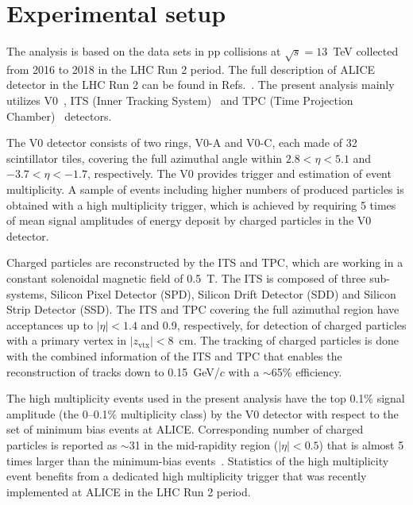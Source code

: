 

\section{Experimental setup}
\label{sec:experiment}

The analysis is based on the data sets in pp collisions at $\sqrt{s} = 13$~TeV collected from 2016 to 2018 in the LHC Run 2 period. The full description of ALICE detector in the LHC Run 2 can be found in Refs.~\cite{Aamodt:2008zz,Abelev:2014ffa}. The present analysis mainly utilizes V0~\cite{Abbas:2013taa}, ITS (Inner Tracking System)~\cite{aliceITS} and TPC (Time Projection Chamber)~\cite{aliceTPC} detectors.


The V0 detector consists of two rings, V0-A and V0-C, each made of 32 scintillator tiles, covering the full azimuthal angle within $2.8 < \eta < 5.1$ and $-3.7 < \eta < -1.7$, respectively. The V0 provides trigger and estimation of event multiplicity. A sample of events including higher numbers of produced particles is obtained with a high multiplicity trigger, which is achieved by requiring 5 times of mean signal amplitudes of energy deposit by charged particles in the V0 detector.

Charged particles are reconstructed by the ITS and TPC, which are working in a constant solenoidal magnetic field of 0.5~T. The ITS is composed of three sub-systems, Silicon Pixel Detector (SPD), Silicon Drift Detector (SDD) and Silicon Strip Detector (SSD). The ITS and TPC covering the full azimuthal region have acceptances up to $|\eta| < 1.4$ and 0.9, respectively, for detection of charged particles with a primary vertex in $|z_\mathrm{vtx}| < 8$~cm. The tracking of charged particles is done with the combined information of the ITS and TPC that enables the reconstruction of tracks down to 0.15~GeV/$c$ with a $\sim $65\% efficiency.

The high multiplicity events used in the present analysis have the top 0.1\% signal amplitude (the 0--0.1\% multiplicity class) by the V0 detector with respect to the set of minimum bias events at ALICE. Corresponding number of charged particles is reported as $\sim$31 in the mid-rapidity region ($|\eta|<0.5$) that is almost 5 times larger than the minimum-bias events~\cite{}. Statistics of the high multiplicity event benefits from a dedicated high multiplicity trigger that was recently implemented at ALICE  in the LHC Run 2 period.  
 


